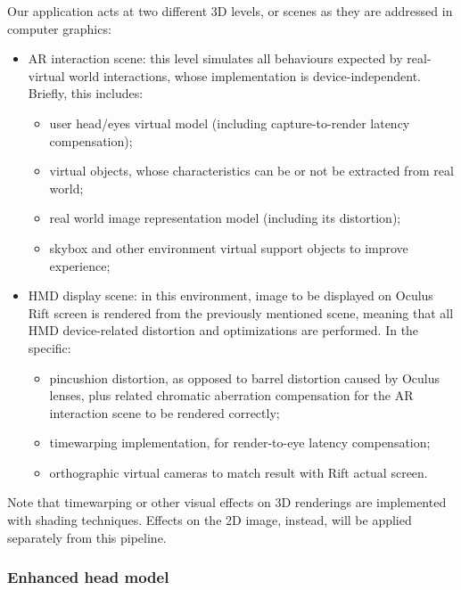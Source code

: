 Our application acts at two different 3D levels, or scenes as they are addressed in computer graphics:
\begin{itemize}
\item AR interaction scene: this level simulates all behaviours expected by real-virtual world interactions, whose implementation is device-independent. Briefly, this includes:
\begin{itemize}
\item user head/eyes virtual model (including capture-to-render latency compensation);
\item virtual objects, whose characteristics can be or not be extracted from real world;
\item real world image representation model (including its distortion);
\item skybox and other environment virtual support objects to improve experience;
\end{itemize}
\item HMD display scene: in this environment, image to be displayed on Oculus Rift screen is rendered from the previously mentioned scene, meaning that all HMD device-related distortion and optimizations are performed. In the specific:
\begin{itemize}
\item pincushion distortion, as opposed to barrel distortion caused by Oculus lenses, plus related chromatic aberration compensation for the AR interaction scene to be rendered correctly;
\item timewarping implementation, for render-to-eye latency compensation;
\item orthographic virtual cameras to match result with Rift actual screen.
\end{itemize}
\end{itemize}
Note that timewarping or other visual effects on 3D renderings are implemented with shading techniques. Effects on the 2D image, instead, will be applied separately from this pipeline.

\subsubsection{Enhanced head model}

